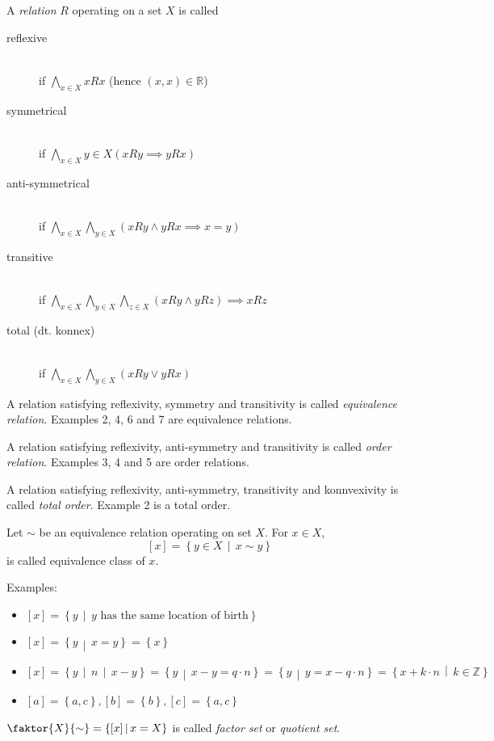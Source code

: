 \documentclass[a4paper,landscape,twocolumn]{article}
\newcommand\set[1]{\left\{#1\right\}}
\newcommand\setdef[2]{\left\{#1\,\middle|\,#2\right\}}
\newcommand\divides[2]{#1\,\mid\,#2}
\begin{document}
A \emph{relation} $R$ operating on a set $X$ is called
\begin{description}
  \item[reflexive] \hfill{} \\
    if $\bigwedge_{x \in X} x R x$ (hence $(x, x) \in \mathbb{R}$)
  \item[symmetrical] \hfill{} \\
    if $\bigwedge_{x \in X}{y \in X} \left(xRy \implies yRx\right)$
  \item[anti-symmetrical] \hfill{} \\
    if $\bigwedge_{x \in X} \bigwedge_{y \in X} (xRy \land yRx \implies x=y)$
  \item[transitive] \hfill{} \\
    if $\bigwedge_{x \in X} \bigwedge_{y \in X} \bigwedge_{z \in X} (xRy \land yRz) \implies xRz$
  \item[total (dt. konnex)] \hfill{} \\
    if $\bigwedge_{x \in X} \bigwedge_{y \in X} (xRy \lor yRx)$
\end{description}

A relation satisfying reflexivity, symmetry and transitivity is called \emph{equivalence relation}.
Examples 2, 4, 6 and 7 are equivalence relations.

A relation satisfying reflexivity, anti-symmetry and transitivity is called \emph{order relation}.
Examples 3, 4 and 5 are order relations.

A relation satisfying reflexivity, anti-symmetry, transitivity and konnvexivity is called \emph{total order}.
Example 2 is a total order.

Let $\sim$ be an equivalence relation operating on set $X$.
For $x \in X$,
\[ [x] = \setdef{y \in X}{x \sim y} \]
is called equivalence class of $x$.

Examples:
\begin{itemize}
  \item $[x] = \setdef{y}{y \text{ has the same location of birth}}$
  \item $[x] = \setdef{y}{x = y} = \set{x}$
  \item $[x] = \setdef{y}{\divides{n}{x - y}} = \setdef{y}{x - y = q\cdot n} = \setdef{y}{y = x - q \cdot n} = \setdef{x + k \cdot n}{k \in \mathbb{Z}}$
  \item $[a] = \set{a, c}, [b] = \set{b}, [c] = \set{a, c}$
\end{itemize}

$\faktor{X}{\sim} = \setdef{[x]}{x = X}$ is called \emph{factor set} or \emph{quotient set}.
\end{document}
